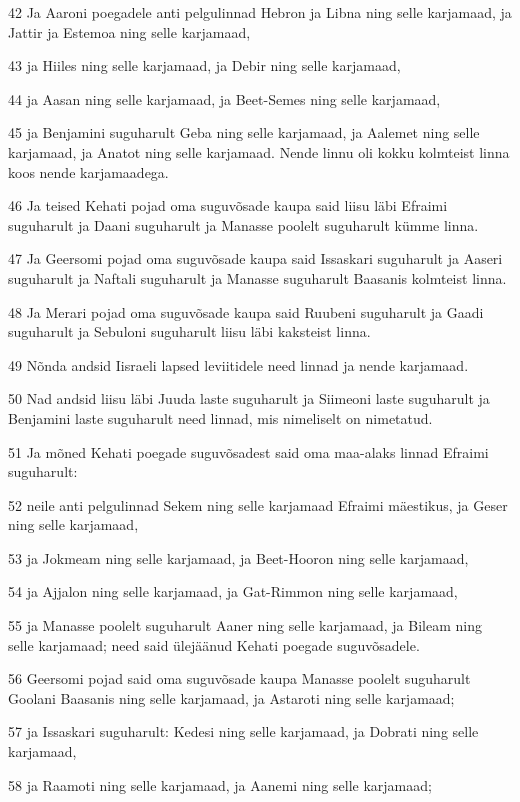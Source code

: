 \par 42 Ja Aaroni poegadele anti pelgulinnad Hebron ja Libna ning selle karjamaad, ja Jattir ja Estemoa ning selle karjamaad,
\par 43 ja Hiiles ning selle karjamaad, ja Debir ning selle karjamaad,
\par 44 ja Aasan ning selle karjamaad, ja Beet-Semes ning selle karjamaad,
\par 45 ja Benjamini suguharult Geba ning selle karjamaad, ja Aalemet ning selle karjamaad, ja Anatot ning selle karjamaad. Nende linnu oli kokku kolmteist linna koos nende karjamaadega.
\par 46 Ja teised Kehati pojad oma suguvõsade kaupa said liisu läbi Efraimi suguharult ja Daani suguharult ja Manasse poolelt suguharult kümme linna.
\par 47 Ja Geersomi pojad oma suguvõsade kaupa said Issaskari suguharult ja Aaseri suguharult ja Naftali suguharult ja Manasse suguharult Baasanis kolmteist linna.
\par 48 Ja Merari pojad oma suguvõsade kaupa said Ruubeni suguharult ja Gaadi suguharult ja Sebuloni suguharult liisu läbi kaksteist linna.
\par 49 Nõnda andsid Iisraeli lapsed leviitidele need linnad ja nende karjamaad.
\par 50 Nad andsid liisu läbi Juuda laste suguharult ja Siimeoni laste suguharult ja Benjamini laste suguharult need linnad, mis nimeliselt on nimetatud.
\par 51 Ja mõned Kehati poegade suguvõsadest said oma maa-alaks linnad Efraimi suguharult:
\par 52 neile anti pelgulinnad Sekem ning selle karjamaad Efraimi mäestikus, ja Geser ning selle karjamaad,
\par 53 ja Jokmeam ning selle karjamaad, ja Beet-Hooron ning selle karjamaad,
\par 54 ja Ajjalon ning selle karjamaad, ja Gat-Rimmon ning selle karjamaad,
\par 55 ja Manasse poolelt suguharult Aaner ning selle karjamaad, ja Bileam ning selle karjamaad; need said ülejäänud Kehati poegade suguvõsadele.
\par 56 Geersomi pojad said oma suguvõsade kaupa Manasse poolelt suguharult Goolani Baasanis ning selle karjamaad, ja Astaroti ning selle karjamaad;
\par 57 ja Issaskari suguharult: Kedesi ning selle karjamaad, ja Dobrati ning selle karjamaad,
\par 58 ja Raamoti ning selle karjamaad, ja Aanemi ning selle karjamaad;
